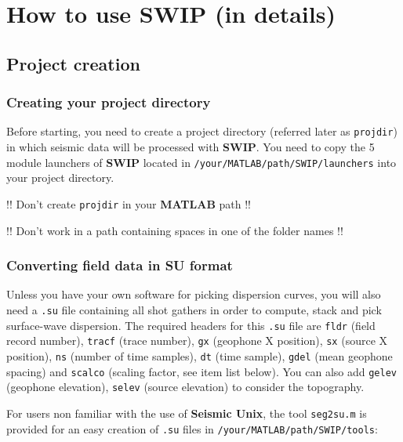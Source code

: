\documentclass[twoside,a4paper]{article}
\def\SWIP{\textbf{SWIP}}
\def\SeismicUnix{\textbf{Seismic Unix}}
\def\MATLAB{\textbf{MATLAB}}
\begin{document}
\clearpage
\section{How to use {\SWIP} (in details)}

\subsection{Project creation}
\subsubsection{Creating your project directory}
Before starting, you need to create a project directory (referred later as \verb|projdir|) in which seismic data will be processed with {\SWIP}. You need to copy the 5 module launchers of {\SWIP} located in \verb|/your/MATLAB/path/SWIP/launchers| into your project directory.

!! Don't create \verb|projdir| in your {\MATLAB} path !!

!! Don't work in a path containing spaces in one of the folder names !!

\subsubsection{Converting field data in SU format}
\label{sec:seg2su}
Unless you have your own software for picking dispersion curves, you will also need a \verb|.su| file containing all shot gathers in order to compute, stack and pick surface-wave dispersion. The required headers for this \verb|.su| file are \verb|fldr| (field record number), \verb|tracf| (trace number), \verb|gx| (geophone X position), \verb|sx| (source X position), \verb|ns| (number of time samples), \verb|dt| (time sample), \verb|gdel| (mean geophone spacing) and \verb|scalco| (scaling factor, see item list below). You can also add \verb|gelev| (geophone elevation), \verb|selev| (source elevation) to consider the topography. 

For users non familiar with the use of {\SeismicUnix}, the tool \verb|seg2su.m| is provided for an easy creation of \verb|.su| files in \verb|/your/MATLAB/path/SWIP/tools|:
\end{document}
